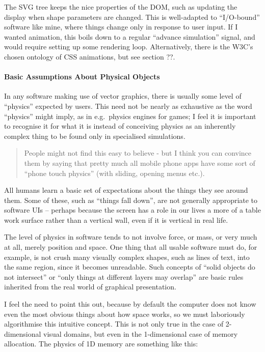 \documentclass[english,submission]{programming}
\begin{document}
The SVG tree keeps the nice properties of the DOM, such as updating the
display when shape parameters are changed. This is well-adapted to
``I/O-bound'' software like mine, where things change only in response
to user input. If I wanted animation, this boils down to a regular
``advance simulation'' signal, and would require setting up some
rendering loop. Alternatively, there is the W3C's chosen ontology of CSS
animations, but see section ??.

\hypertarget{basic-assumptions-about-physical-objects}{%
\paragraph{Basic Assumptions About Physical
Objects}\label{basic-assumptions-about-physical-objects}}

In any software making use of vector graphics, there is usually some
level of ``physics'' expected by users. This need not be nearly as
exhaustive as the word ``physics'' might imply, as in e.g.~physics
engines for games; I feel it is important to recognise it for what it is
instead of conceiving physics as an inherently complex thing to be found
only in specialised simulations.

\begin{quote}
People might not find this easy to believe - but I think you can
convince them by saying that pretty much all mobile phone apps have some
sort of ``phone touch physics'' (with sliding, opening menus etc.).
\end{quote}

All humans learn a basic set of expectations about the things they see
around them. Some of these, such as ``things fall down'', are not
generally appropriate to software UIs -- perhaps because the screen has
a role in our lives a more of a table work surface rather than a
vertical wall, even if it is vertical in real life.

The level of physics in software tends to not involve force, or mass, or
very much at all, merely position and space. One thing that all usable
software must do, for example, is not crush many visually complex
shapes, such as lines of text, into the same region, since it becomes
unreadable. Such concepts of ``solid objects do not intersect'' or
``only things at different layers may overlap'' are basic rules
inherited from the real world of graphical presentation.

I feel the need to point this out, because by default the computer does
not know even the most obvious things about how space works, so we must
laboriously algorithmise this intuitive concept. This is not only true
in the case of 2-dimensional visual domains, but even in the
1-dimensional case of memory allocation. The physics of 1D memory are
something like this:
\end{document}
